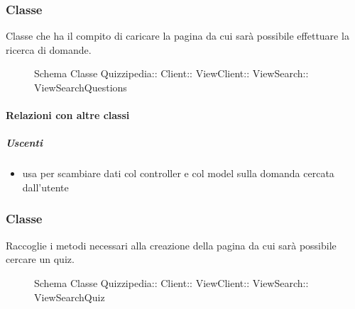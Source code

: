 \subsubsection{Classe }
Classe che ha il compito di caricare la pagina da cui sarà possibile effettuare la ricerca di domande.
\begin{figure}[H]
\centering
\noindent{}
\caption[Schema Classe ViewSearchQuestions]{Schema Classe Quizzipedia:: Client:: ViewClient:: ViewSearch:: ViewSearchQuestions}
\end{figure}
\paragraph{Relazioni con altre classi}
\subparagraph{Uscenti}
\begin{itemize}
\item usa  per scambiare dati col controller e col model sulla domanda cercata dall'utente
\end{itemize}
\subsubsection{Classe }
Raccoglie i metodi necessari alla creazione della pagina da cui sarà possibile cercare un quiz.
\begin{figure}[H]
\centering
\noindent{}
\caption[Schema Classe ViewSearchQuiz]{Schema Classe Quizzipedia:: Client:: ViewClient:: ViewSearch:: ViewSearchQuiz}
\end{figure}
